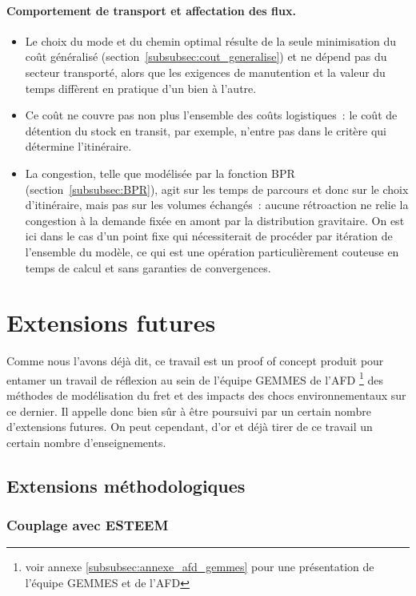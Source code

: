 \documentclass[12pt,a4paper,french]{report}
\begin{document}
	\paragraph{Comportement de transport et affectation des flux.}
	\begin{itemize}
		\item Le choix du mode et du chemin optimal résulte de la seule minimisation du coût généralisé (section~\ref{subsubsec:cout_generalise}) et ne dépend pas du secteur transporté, alors que les exigences de manutention et la valeur du temps diffèrent en pratique d'un bien à l'autre.
		\item Ce coût ne couvre pas non plus l'ensemble des coûts logistiques~: le coût de détention du stock en transit, par exemple, n'entre pas dans le critère qui détermine l'itinéraire.
		\item La congestion, telle que modélisée par la fonction BPR (section~\ref{subsubsec:BPR}), agit sur les temps de parcours et donc sur le choix d'itinéraire, mais pas sur les volumes échangés~: aucune rétroaction ne relie la congestion à la demande fixée en amont par la distribution gravitaire. On est ici dans le cas d'un point fixe qui nécessiterait de procéder par itération de l'ensemble du modèle, ce qui est une opération particulièrement couteuse en temps de calcul et sans garanties de convergences.
	\end{itemize}
	
	\section{Extensions futures}
	
	Comme nous l'avons déjà dit, ce travail est un proof of concept produit pour entamer un travail de réflexion au sein de l'équipe GEMMES de l'AFD \footnote{voir annexe \ref{subsubsec:annexe_afd_gemmes} pour une présentation de l'équipe GEMMES et de l'AFD} des méthodes de modélisation du fret et des impacts des chocs environnementaux sur ce dernier. Il appelle donc bien sûr à être poursuivi par un certain nombre d'extensions futures. On peut cependant, d'or et déjà tirer de ce travail un certain nombre d'enseignements.
	
	\subsection{Extensions méthodologiques}
	
	\subsubsection{Couplage avec ESTEEM}
	
\end{document}
